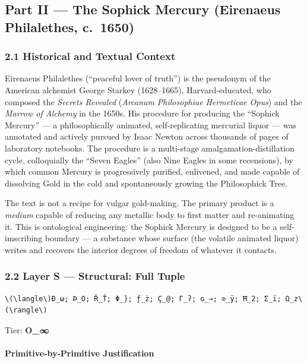 \documentclass[
  11pt,
  a4paper,
]{article}
\begin{document}
\subsection{Part II --- The Sophick Mercury (Eirenaeus Philalethes,
c.~1650)}\label{part-ii-the-sophick-mercury-eirenaeus-philalethes-c.-1650}

\subsubsection{2.1 Historical and Textual
Context}\label{historical-and-textual-context}

Eirenaeus Philalethes (``peaceful lover of truth'') is the pseudonym of
the American alchemist George Starkey (1628--1665), Harvard-educated,
who composed the \emph{Secrets Revealed} (\emph{Arcanum Philosophiae
Hermeticae Opus}) and the \emph{Marrow of Alchemy} in the 1650s. His
procedure for producing the ``Sophick Mercury'' --- a philosophically
animated, self-replicating mercurial liquor --- was annotated and
actively pursued by Isaac Newton across thousands of pages of laboratory
notebooks. The procedure is a multi-stage amalgamation-distillation
cycle, colloquially the ``Seven Eagles'' (also Nine Eagles in some
recensions), by which common Mercury is progressively purified,
enlivened, and made capable of dissolving Gold in the cold and
spontaneously growing the Philosophick Tree.

The text is not a recipe for vulgar gold-making. The primary product is
a \emph{medium} capable of reducing any metallic body to first matter
and re-animating it. This is ontological engineering: the Sophick
Mercury is designed to be a self-imscribing boundary --- a substance
whose surface (the volatile animated liquor) writes and recovers the
interior degrees of freedom of whatever it contacts.

\subsubsection{2.2 Layer S --- Structural: Full
Tuple}\label{layer-s-structural-full-tuple}

\begin{verbatim}
\(\langle\)Ð_ω; Þ_O; Ř_Ť; Φ_}; ƒ_ż; Ç_@; Γ_ʔ; ɢ_→; ⊙_ÿ; Ħ_2; Σ_ï; Ω_z\(\rangle\)
\end{verbatim}

Tier: \textbf{O\_∞}

\paragraph{Primitive-by-Primitive
Justification}\label{primitive-by-primitive-justification}
\end{document}
